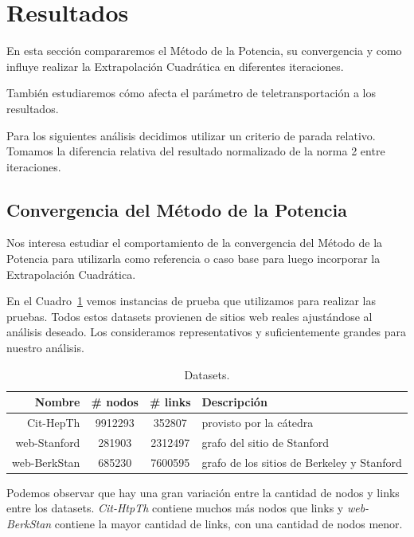 \section{Resultados}

En esta sección compararemos el Método de la Potencia, su convergencia y como
influye realizar la Extrapolación Cuadrática en diferentes iteraciones.

También estudiaremos cómo afecta el parámetro de teletransportación a los
resultados.

Para los siguientes análisis decidimos utilizar un criterio de parada relativo.
Tomamos la diferencia relativa del resultado normalizado de la norma 2 entre
iteraciones.

\subsection{Convergencia del Método de la Potencia}\label{sec:convergencia}

Nos interesa estudiar el comportamiento de la convergencia del Método de la
Potencia para utilizarla como referencia o caso base para luego incorporar la
Extrapolación Cuadrática.

En el Cuadro~\ref{tab:datasets} vemos instancias de prueba que utilizamos para
realizar las pruebas. Todos estos datasets provienen de sitios web reales
ajustándose al análisis deseado. Los consideramos representativos y
suficientemente grandes para nuestro análisis.

\begin{table}[!htbp]
    \centering
    \begin{tabular}{|r|c|c|l|} \hline
        Nombre & \# nodos & \# links & Descripción \\ \hline
        Cit-HepTh & 9912293 & 352807 & provisto por la cátedra \\ \hline
        web-Stanford & 281903 & 2312497 & grafo del sitio de Stanford \\ \hline
        web-BerkStan & 685230 & 7600595 & grafo de los sitios de Berkeley y Stanford \\ \hline
    \end{tabular}
    \caption{Datasets.}\label{tab:datasets}
\end{table}

Podemos observar que hay una gran variación entre la cantidad de nodos y links
entre los datasets. \emph{Cit-HtpTh} contiene muchos más nodos que links y
\emph{web-BerkStan} contiene la mayor cantidad de links, con una cantidad de
nodos menor.

